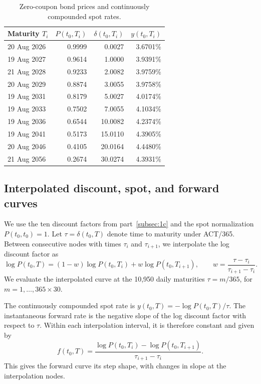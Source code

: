\documentclass[11pt,a4paper]{article}
\begin{document}
\begin{table}[H]
  \centering
  \caption{Zero-coupon bond prices and continuously compounded spot rates.}
  \label{tab:zero-coupon-bonds}
  \begin{tabular}{lrrr}
    \toprule
    Maturity \(T_i\) & \(P(t_0,T_i)\) & \(\delta(t_0,T_i)\)
                    & \(y(t_0,T_i)\) \\
    \midrule
    20 Aug 2026 & 0.9999 &  0.0027 & 3.6701\% \\
    19 Aug 2027 & 0.9614 &  1.0000 & 3.9391\% \\
    21 Aug 2028 & 0.9233 &  2.0082 & 3.9759\% \\
    20 Aug 2029 & 0.8874 &  3.0055 & 3.9758\% \\
    19 Aug 2031 & 0.8179 &  5.0027 & 4.0174\% \\
    19 Aug 2033 & 0.7502 &  7.0055 & 4.1034\% \\
    19 Aug 2036 & 0.6544 & 10.0082 & 4.2374\% \\
    19 Aug 2041 & 0.5173 & 15.0110 & 4.3905\% \\
    20 Aug 2046 & 0.4105 & 20.0164 & 4.4480\% \\
    21 Aug 2056 & 0.2674 & 30.0274 & 4.3931\% \\
    \bottomrule
  \end{tabular}
\end{table}

\subsection{Interpolated discount, spot, and forward curves}\label{subsec:1d}

We use the ten discount factors from part~\ref{subsec:1c} and the spot
normalization \(P(t_0,t_0)=1\). Let \(\tau=\delta(t_0,T)\) denote
time to maturity under ACT/365. Between consecutive nodes with
times \(\tau_i\) and \(\tau_{i+1}\), we interpolate the log
discount factor as
\[
\log P(t_0,T)
  = (1-w)\log P(t_0,T_i) + w\log P(t_0,T_{i+1}),
\qquad
w=\frac{\tau-\tau_i}{\tau_{i+1}-\tau_i}.
\]
We evaluate the interpolated curve at the 10,950 daily maturities
\(\tau=m/365\), for \(m=1,\ldots,365\times30\).

The continuously compounded spot rate is
\(y(t_0,T)=-\log P(t_0,T)/\tau\). The instantaneous forward rate is
the negative slope of the log discount factor with respect to
\(\tau\). Within each interpolation interval, it is therefore
constant and given by
\[
f(t_0,T)
  = \frac{\log P(t_0,T_i)-\log P(t_0,T_{i+1})}
         {\tau_{i+1}-\tau_i}.
\]
This gives the forward curve its step shape, with changes in slope
at the interpolation nodes.
\end{document}

